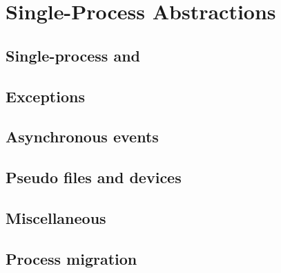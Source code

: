 \section{Single-Process Abstractions}


















\subsection{Single-process  and }




\subsection{Exceptions}





\subsection{Asynchronous events}




\subsection{Pseudo files and devices}




\subsection{Miscellaneous}




\subsection{Process migration}